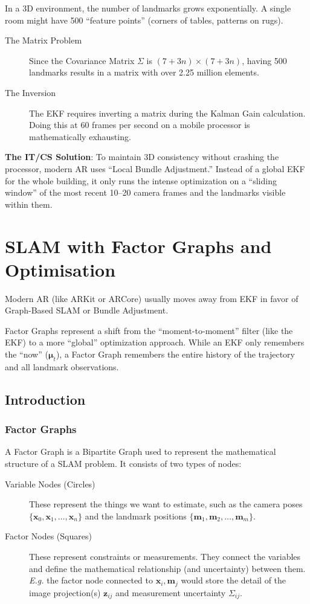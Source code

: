 \documentclass[11pt]{article}
\begin{document}
In a 3D environment, the number of landmarks grows
exponentially. A single room might have 500 ``feature
points'' (corners of tables, patterns on rugs).

\begin{description}
\item[{The Matrix Problem}] Since the Covariance Matrix
\(\Sigma\) is \((7+3n)\times(7+3n)\), having 500
landmarks results in a matrix with over 2.25 million
elements.
\item[{The Inversion}] The EKF requires inverting a matrix
during the Kalman Gain calculation. Doing this at 60
frames per second on a mobile processor is
mathematically exhausting.
\end{description}

\textbf{The IT/CS Solution}: To maintain 3D consistency
without crashing the processor, modern AR uses ``Local
Bundle Adjustment.''  Instead of a global EKF for the
whole building, it only runs the intense optimization
on a ``sliding window'' of the most recent 10--20 camera
frames and the landmarks visible within them.
\section{SLAM with Factor Graphs and Optimisation}
\label{sec:org19da965}
Modern AR (like ARKit or ARCore) usually moves away
from EKF in favor of Graph-Based SLAM or Bundle
Adjustment.

Factor Graphs represent a shift from the
``moment-to-moment'' filter (like the EKF) to a more
``global'' optimization approach.  While an EKF only
remembers the ``now'' (\(\boldsymbol{\mu}_t\)), a Factor
Graph remembers the entire history of the trajectory
and all landmark observations.
\subsection{Introduction}
\label{sec:org2e35ee5}

\subsubsection{Factor Graphs}
\label{sec:orgb3c2007}

A Factor Graph is a Bipartite Graph used to represent
the mathematical structure of a SLAM problem.  It
consists of two types of nodes:

\begin{description}
\item[{Variable Nodes (Circles)}] These represent the
things we want to estimate, such as the camera poses
\(\{\mathbf{x}_0, \mathbf{x}_1, \dots, \mathbf{x}_n\}\)
and the landmark positions \(\{\mathbf{m}_1,
  \mathbf{m}_2, \dots, \mathbf{m}_m\}\).
\item[{Factor Nodes (Squares)}] These represent constraints
or measurements.  They connect the variables and
define the mathematical relationship (and
uncertainty) between them.  \emph{E.g.} the factor node
connected to \(\mathbf{x}_i, \mathbf{m}_j\) would store
the detail of the image projection(s)
\(\mathbf{z}_{ij}\) and measurement uncertainty
\(\Sigma_{ij}\).
\end{description}
\end{document}
